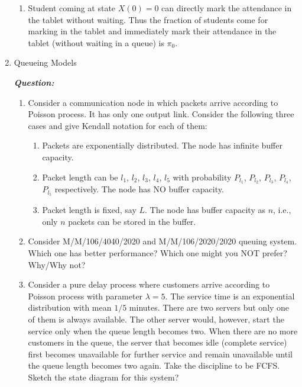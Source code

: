 \documentclass[12pt, oneside]{article}
\begin{document}
\begin{enumerate}
\begin{enumerate}[label=(\alph*)]
\item Student coming at state $X(0) = 0$ can directly mark the attendance in the tablet without waiting. Thus the fraction of students come for marking in the tablet and immediately mark their attendance in the tablet (without waiting in a queue) is $\pi_0$.

\end{enumerate}



\newpage
\item Queueing Models

\textbf{\textit{Question:}}

\begin{enumerate}[label=(\alph*)]
\item 
        Consider a communication node in which packets arrive according to Poisson process. It has only one output link. Consider the following three cases and give Kendall notation for each of them:
        
        \begin{enumerate}[label=(\roman*)]
            \item Packets are exponentially distributed. The node has infinite buffer capacity.
            \item Packet length can be $l_1$, $l_2$, $l_3$, $l_4$, $l_5$ with probability $P_{l_1}$, $P_{l_2}$, $P_{l_3}$, $P_{l_4}$, $P_{l_5}$ respectively. The node has NO buffer capacity.
            \item Packet length is fixed, say $L$. The node has buffer capacity as $n$, i.e., only $n$ packets can be stored in the buffer.
        \end{enumerate}
\item 
        Consider M/M/106/4040/2020 and M/M/106/2020/2020 queuing system. Which one has better performance? Which one might you NOT prefer? Why/Why not?

\item
        Consider a pure delay process where customers arrive according to Poisson process with parameter $\lambda = 5$. The service time is an exponential distribution with mean $1/5$ minutes. There are two servers but only one of them is always available. The other server would, however, start the service only when the queue length becomes two. When there are no more customers in the queue, the server that becomes idle (complete service) first becomes unavailable for further service and remain unavailable until the queue length becomes two again. Take the discipline to be FCFS. Sketch the state diagram for this system?


\end{enumerate}
\end{enumerate}
\end{document}
